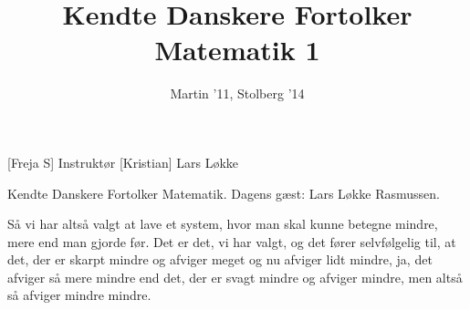 \documentclass[a4paper,11pt]{article}
\title{Kendte Danskere Fortolker Matematik 1}
\author{Martin '11, Stolberg '14}
\begin{document}
\maketitle

\begin{roles}
[Freja S] Instruktør
[Kristian] Lars Løkke
\end{roles}


\begin{sketch}
 Kendte Danskere Fortolker Matematik. Dagens gæst: Lars Løkke Rasmussen.


 Så vi har altså valgt at lave et system, hvor man skal kunne betegne mindre, mere end man gjorde før. Det er det, vi har valgt, og det fører selvfølgelig til, at det, der er skarpt mindre og afviger meget og nu afviger lidt mindre, ja, det afviger så mere mindre end det, der er svagt mindre og afviger mindre, men altså så afviger mindre mindre.

\end{sketch}
\end{document}
